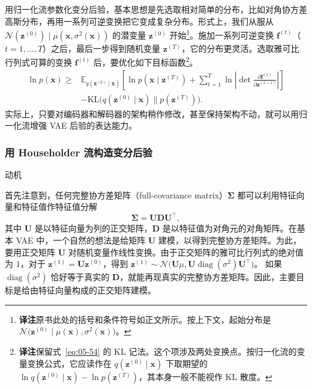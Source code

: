用归一化流参数化变分后验，基本思想是先选取相对简单的分布，比如对角协方差高斯分布，再用一系列可逆变换把它变成复杂分布。形式上，我们从服从 $\mathcal{N}(\mathbf{z}^{(0)})\mid\mu(\mathbf{x},\sigma^2(\mathbf{x}))$ 的潜变量 $\mathbf{z}^{(0)}$ 开始\footnote{\textbf{译注}\quad 原书此处的括号和条件符号如正文所示。按上下文，起始分布是 $\mathcal{N}\bigl(\mathbf{z}^{(0)}\mid\mu(\mathbf{x}),\sigma^2(\mathbf{x})\bigr)$。}。施加一系列可逆变换 $\mathbf{f}^{(t)}$（$t=1,\ldots,T$）之后，最后一步得到随机变量 $\mathbf{z}^{(T)}$，它的分布更灵活。选取雅可比行列式可算的变换 $\mathbf{f}^{(t)}$ 后，要优化如下目标函数\footnote{\textbf{译注}\quad 保留式~\eqref{eq:05-54} 的 KL 记法。这个项涉及两处变换点。按归一化流的变量变换公式，它应读作在 $q(\mathbf{z}^{(0)}\mid\mathbf{x})$ 下取期望的 $\ln q(\mathbf{z}^{(0)}\mid\mathbf{x})-\ln p(\mathbf{z}^{(T)})$，其本身一般不能视作 KL 散度。}。
\begin{equation}
\begin{aligned}
\ln p(\mathbf{x})\geq{}&\mathbb{E}_{q(\mathbf{z}^{(0)}\mid\mathbf{x})}
 \left[\ln p(\mathbf{x}\mid\mathbf{z}^{(T)})+
   \sum_{t=1}^T\ln\left|\det\frac{\partial\mathbf{f}^{(t)}}
                                     {\partial\mathbf{z}^{(t-1)}}\right|\right]\\
 &-\mathrm{KL}\bigl(q(\mathbf{z}^{(0)}\mid\mathbf{x})\|p(\mathbf{z}^{(T)})\bigr).
\end{aligned}
\tag{5.54}\label{eq:05-54}
\end{equation}
实际上，只要对编码器和解码器的架构稍作修改，甚至保持架构不动，就可以用归一化流增强 VAE 后验的表达能力。

\subsubsection[用 Householder 流构造变分后验]{用 Householder 流构造变分后验 }
\noindent 动机\par\smallskip
首先注意到，任何完整协方差矩阵（full-covariance matrix）$\boldsymbol{\Sigma}$ 都可以利用特征向量和特征值作特征值分解
\begin{equation}
\boldsymbol{\Sigma}=\mathbf{U}\mathbf{D}\mathbf{U}^{\top},
\tag{5.55}\label{eq:05-55}
\end{equation}
其中 $\mathbf{U}$ 是以特征向量为列的正交矩阵，$\mathbf{D}$ 是以特征值为对角元的对角矩阵。在基本 VAE 中，一个自然的想法是给矩阵 $\mathbf{U}$ 建模，以得到完整协方差矩阵。为此，要用正交矩阵 $\mathbf{U}$ 对随机变量作线性变换。由于正交矩阵的雅可比行列式的绝对值为 $1$，对于 $\mathbf{z}^{(1)}=\mathbf{U}\mathbf{z}^{(0)}$，得到 $\mathbf{z}^{(1)}\sim\mathcal{N}\bigl(\mathbf{U}\mu,\mathbf{U}\operatorname{diag}(\sigma^2)\mathbf{U}^\top\bigr)$。
如果 $\operatorname{diag}(\sigma^2)$ 恰好等于真实的 $\mathbf{D}$，就能再现真实的完整协方差矩阵。因此，主要目标是给由特征向量构成的正交矩阵建模。

